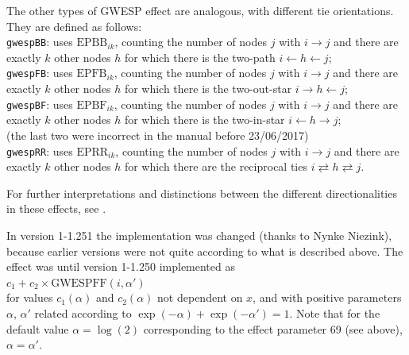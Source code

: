 \documentclass[a4paper,fleqn,11pt]{article}
\newcommand{\+}{\, + \,}
\begin{document}
\begin{enumerate}
The other types of GWESP effect are analogous, with
different tie orientations. They are defined as follows:\\
\texttt{gwespBB}: uses $\text{EPBB}_{ik}$, counting the number of nodes $j$
with $i \rightarrow j$ and there are exactly $k$ other
nodes $h$ for which there is the two-path $i \leftarrow h \leftarrow j$;\\
\texttt{gwespFB}: uses $\text{EPFB}_{ik}$, counting the number of nodes $j$
with $i \rightarrow j$ and there are exactly $k$ other
nodes $h$ for which there is the two-out-star $i \rightarrow h \leftarrow j$;\\
\texttt{gwespBF}: uses $\text{EPBF}_{ik}$, counting the number of nodes $j$
with $i \rightarrow j$ and there are exactly $k$ other
nodes $h$ for which there is the two-in-star $i \leftarrow h \rightarrow j$;\\
(the last two were incorrect in the manual before 23/06/2017)\\
\texttt{gwespRR}: uses $\text{EPRR}_{ik}$, counting the number of nodes $j$
with $i \rightarrow j$ and there are exactly $k$ other
nodes $h$ for which there are the reciprocal ties $i \rightleftarrows h \rightleftarrows j$.

For further interpretations and distinctions between the different directionalities
in these effects, see \citet{RPW2009}.

In version 1-1.251 the implementation was changed (thanks to Nynke Niezink),
because earlier versions were not quite according to what is described above.
The effect was until version 1-1.250 implemented as\\
$c_1 + c_2 \times \text{GWESPFF}(i, \alpha')$\\
for values $c_1(\alpha)$ and $c_2(\alpha)$ not dependent on $x$, and with
positive parameters $\alpha$, $\alpha'$ related according to
$\exp(-\alpha) + \exp(-\alpha') = 1$. Note that for the default value
$\alpha = \log(2)$ corresponding to the effect parameter 69 (see above), $\alpha = \alpha'$.


\end{enumerate}
\end{document}

